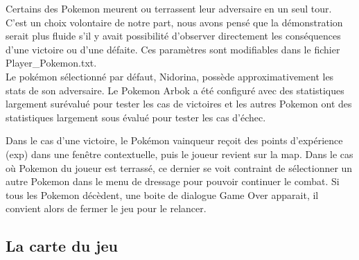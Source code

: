 Certains des Pokemon meurent ou terrassent leur adversaire en un seul tour. C'est un choix volontaire de notre part, nous avons pensé que la démonstration serait plus fluide s'il y avait possibilité d'observer directement les conséquences d'une victoire ou d'une défaite. Ces paramètres sont modifiables dans le fichier Player\_Pokemon.txt.\\

Le pokémon sélectionné par défaut, Nidorina, possède approximativement les stats de son adversaire. Le Pokemon Arbok a été configuré avec des statistiques largement surévalué pour tester les cas de victoires et les autres Pokemon ont des statistiques largement sous évalué pour tester les cas d'échec.  

Dans le cas d'une victoire, le Pokémon vainqueur reçoit des points d'expérience (exp) dans une fenêtre contextuelle, puis le joueur revient sur la map. Dans le cas où Pokemon du joueur est terrassé, ce dernier se voit contraint de sélectionner un autre Pokemon dans le menu de dressage pour pouvoir continuer le combat. Si tous les Pokemon décèdent, une boite de dialogue Game Over apparait, il convient alors de fermer le jeu pour le relancer.

\subsection{La carte du jeu}

